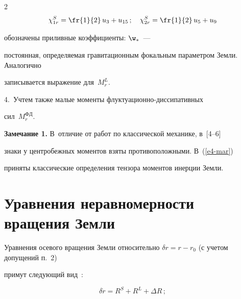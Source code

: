 \begin{multicols}{2}
    \begin{equation}


    \chi_{1r}^S = \fr{1}{2}\, u_3 +u_{15}\,;\quad 


    \chi_{2r}^S =\fr{1}{2}\, u_5 + u_9\label{e6-mar}


    \end{equation}


обозначены приливные коэффициенты: $\w_*$~--- 


постоянная, определяемая гравитационным фокальным параметром Земли. Аналогично 


записывается выражение для~$M_r^L$.





\smallskip





4.\ Учтем также малые моменты флук\-ту\-а\-ци\-он\-но-дис\-си\-па\-тив\-ных 


сил~$M_r^{\mathrm{ФД}}$.





\bigskip





\noindent


\textbf{Замечание 1.}  В~отличие от работ по классической механике, в~[4--6] 


знаки у центробежных моментов взяты противоположными. В~(\ref{e4-mar}) 


приняты классические определения тензора моментов инерции Земли.





\section{Уравнения неравномерности вращения Земли}





Уравнения осевого вращения Земли относительно  $\delta r = r-r_0$ (с учетом допущений п.~2) 


примут следующий вид~\cite{8-mar}:


\begin{equation}


\delta \dot r = R^S + R^L +\Delta R\,;\label{e7-mar}


\end{equation}






\end{multicols}

